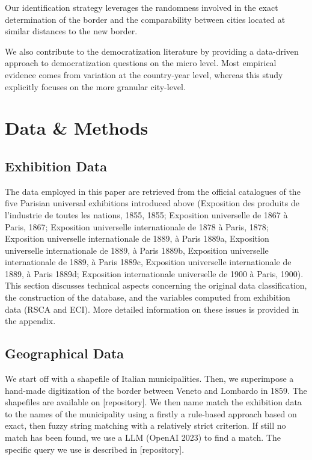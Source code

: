 Our identification strategy leverages the randomness involved in the exact determination of the border and the comparability between cities located at similar distances to the new border. 

We also contribute to the democratization literature by providing a data-driven approach to democratization questions on the micro level. Most empirical evidence comes from variation at the country-year level, whereas this study explicitly focuses on the more granular city-level. 


\section{Data \& Methods}

\subsection{Exhibition Data} 
The data employed in this paper are retrieved from the official catalogues of the five Parisian universal exhibitions introduced above (Exposition des produits de l’industrie de toutes les nations, 1855, 1855; Exposition universelle de 1867 à Paris, 1867; Exposition universelle internationale de 1878 à Paris, 1878; Exposition universelle internationale de 1889, à Paris 1889a, Exposition universelle internationale de 1889, à Paris 1889b, Exposition universelle internationale de 1889, à Paris 1889c, Exposition universelle internationale de 1889, à Paris 1889d; Exposition internationale universelle de 1900 à Paris, 1900). This section discusses technical aspects concerning the original data classification, the construction of the database, and the variables computed from exhibition data (RSCA and ECI). More detailed information on these issues is provided in the appendix.

\subsection{Geographical Data}

We start off with a shapefile of Italian municipalities. Then, we superimpose a hand-made digitization of the border between Veneto and Lombardo in 1859. The shapefiles are available on [repository]. We then name match the exhibition data to the names of the municipality using a firstly a rule-based approach based on exact, then fuzzy string matching with a relatively strict criterion. If still no match has been found, we use a LLM (OpenAI 2023) to find a match. The specific query we use is described in [repository]. 

